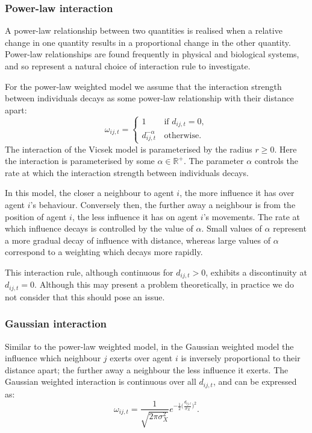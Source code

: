 \subsubsection{Power-law interaction}

A power-law relationship between two quantities is realised when a relative
change in one quantity results in a proportional change in the other quantity.
Power-law relationships are found frequently in physical and biological
systems, and so represent a natural choice of interaction rule to investigate.

For the power-law weighted model we assume that the interaction strength
between individuals decays as some power-law relationship with their distance
apart:
\begin{equation}
    \label{eq:power_law_interaction}
	\omega_{ij,t} =
	\begin{cases}
		1                  & \, \text{if } d_{ij,t} = 0, \\
		d_{ij,t}^{-\alpha} & \, \text{otherwise}.
	\end{cases}
\end{equation}
The interaction of the Vicsek model is parameterised by the radius $r \geq 0$.
Here the interaction is parameterised by some $\alpha\in\mathbb{R}^+$. The
parameter $\alpha$ controls the rate at which the interaction strength between
individuals decays. 

In this model, the closer a neighbour to agent $i$, the more influence it has
over agent $i$'s behaviour. Conversely then, the further away a neighbour is
from the position of agent $i$, the less influence it has on agent $i$'s
movements. The rate at which influence decays is controlled by the value of
$\alpha$. Small values of $\alpha$ represent a more gradual decay of influence
with distance, whereas large values of $\alpha$ correspond to a weighting which
decays more rapidly.

This interaction rule, although continuous for $d_{ij,t} > 0$, exhibits a
discontinuity at $d_{ij,t}=0$. Although this may present a problem
theoretically, in practice we do not consider that this should pose an issue.

\subsubsection{Gaussian interaction}

Similar to the power-law weighted model, in the Gaussian weighted model the
influence which neighbour $j$ exerts over agent $i$ is inversely proportional
to their distance apart; the further away a neighbour the less influence it
exerts. The Gaussian weighted interaction is continuous over all $d_{ij,t}$,
and can be expressed as:
\begin{equation}
    \label{eq:gaussian_interaction}
	\omega_{ij,t} =
	\frac{1}{\sqrt{2\pi\sigma_X^2}}
	e^{-\frac{1}{2}\big(\frac{d_{ij,t}}{\sigma_X}\big)^2}.
\end{equation}

